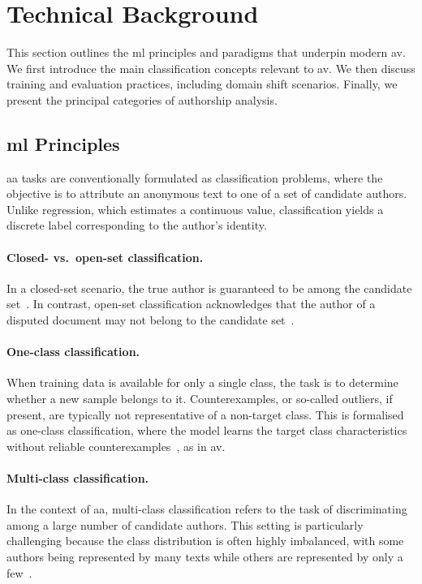 \section{Technical Background}
\label{sec:technical_background}

This section outlines the \ac{ml} principles and paradigms that underpin modern \ac{av}. 
We first introduce the main classification concepts relevant to \ac{av}. 
We then discuss training and evaluation practices, including domain shift scenarios. 
Finally, we present the principal categories of authorship analysis.

\subsection{\acl{ml} Principles}

\ac{aa} tasks are conventionally formulated as classification problems, where the objective is to attribute an anonymous text to one of a set of candidate authors. 
Unlike regression, which estimates a continuous value, classification yields a discrete label corresponding to the author’s identity.

\paragraph{Closed- vs.\ open-set classification.} 
In a closed-set scenario, the true author is guaranteed to be among the candidate set~\citep{koppel_authorship_2011}. 
In contrast, open-set classification acknowledges that the author of a disputed document may not belong to the candidate set~\citep{stamatatos_survey_2009}. 

\paragraph{One-class classification.} 
When training data is available for only a single class, the task is to determine whether a new sample belongs to it. 
Counterexamples, or so-called outliers, if present, are typically not representative of a non-target class. 
This is formalised as one-class classification, where the model learns the target class characteristics without reliable counterexamples~\citep{stein_intrinsic_2011,koppel_authorship_2004}, as in \ac{av}.

\paragraph{Multi-class classification.} 
In the context of \ac{aa}, multi-class classification refers to the task of discriminating among a large number of candidate authors. 
This setting is particularly challenging because the class distribution is often highly imbalanced, with some authors being represented by many texts while others are represented by only a few~\citep{stamatatos_survey_2009,koppel_authorship_2004}. 


